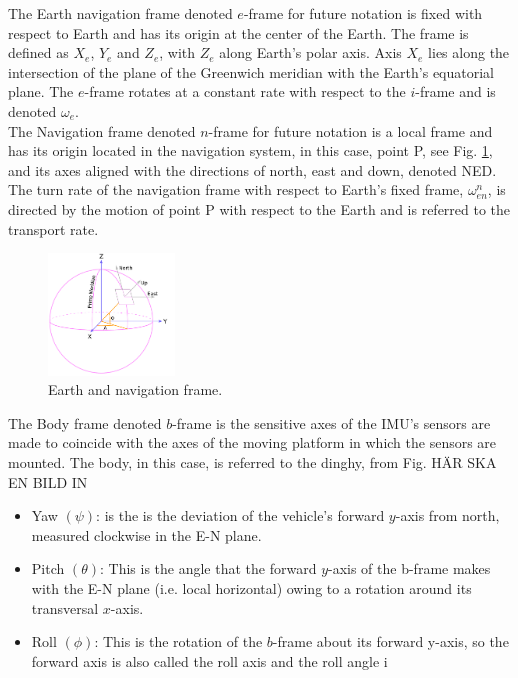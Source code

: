 The Earth navigation frame denoted $e$-frame for future notation is fixed with respect to Earth and has its origin at the center of the Earth. The frame is defined as $X_e$, $Y_e$ and $Z_e$, with $Z_e$ along Earth's polar axis. Axis $X_e$ lies along the intersection of the plane of the Greenwich meridian with the Earth's equatorial plane. The $e$-frame rotates at a constant rate with respect to the $i$-frame and is denoted $\omega_e$.\\

The Navigation frame denoted $n$-frame for future notation is a local frame and has its origin located in the navigation system, in this case, point P, see Fig. \ref{WGS}, and its axes aligned with the directions of north, east and down, denoted NED. The turn rate of the navigation frame with respect to Earth's fixed frame, $\omega_{en}^n$, is directed by the motion of point P with respect to the Earth and is referred to the transport rate.   

\begin{figure}[H]
\centering
\includegraphics[width=0.3\textwidth]{Figures/WGS-coordinates.png}
\caption{Earth and navigation frame.}
\label{WGS}
\end{figure}

The Body frame denoted $b$-frame is the sensitive axes of the IMU's sensors are made to coincide with the axes of the moving platform in which the sensors are mounted. The body, in this case, is referred to the dinghy, from Fig. HÄR SKA EN BILD IN
\begin{itemize}
\item Yaw $(\psi)$: is the is the deviation of the vehicle’s forward $y$-axis from north, measured clockwise in the E-N plane.
\item Pitch $(\theta)$: This is the angle that the forward $y$-axis of the b-frame makes with the
E-N plane (i.e. local horizontal) owing to a rotation around its transversal $x$-axis.
\item Roll $(\phi)$: This is the rotation of the $b$-frame about its forward y-axis, so the
forward axis is also called the roll axis and the roll angle i
\end{itemize}

